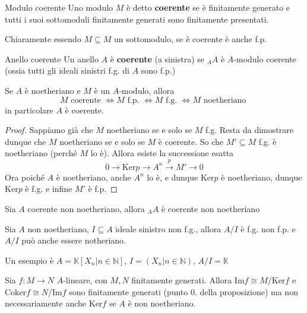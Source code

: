\begin{definition}{Modulo coerente}
    Uno modulo \(M\) è detto \textbf{coerente} se è finitamente generato e tutti
    i suoi sottomoduli finitamente generati sono finitamente presentati.
\end{definition}
\begin{remark}{}
    Chiaramente essendo \(M \subseteq M \) un sottomodulo, se è coerente è anche
    f.p.
\end{remark}
\begin{definition}{Anello coerente}
    Un anello \(A\) è \textbf{coerente} (a sinistra) se \(_AA\) è \(A\)-modulo
    coerente (ossia tutti gli ideali sinistri f.g. di \(A\) sono f.p.)
\end{definition}
\begin{remark}{}
    Se \(A\) è noetheriano e \(M\) è un \(A\)-modulo, allora
    \[
      M \text{ coerente } \iff M \text{ f.p. } \iff M \text{ f.g. } \iff M
      \text{ noetheriano }
    \]
    in particolare \(A\) è coerente. 
\end{remark}
\begin{proof}{}
    Sappiamo già che \(M\) noetheriano se e solo se \(M\) f.g. Resta da
    dimostrare dunque che \(M\) noetheriano se e solo se \(M\) è coerente. So
    che \(M' \subseteq M \) f.g. è noetheriano (perché \(M\) lo è). Allora esiste la successione esatta 
    \[
      0 \to \mathrm{Ker} p \to A^{n} \overset{p}{\to } M' \to 0
    \]
    Ora poiché \(A\) è noetheriano, anche \(A^{n}\) lo è, e dunque \(\mathrm{Ker} p \) è noetheriano, dunque \(\mathrm{Ker}p\) è f.g. e infine \(M'\) è f.p.
\end{proof}
\begin{remark}{}
    Sia \(A\) coerente non noetheriano, allora \(_AA\) è coerente non
    noetheriano
\end{remark}
\begin{example}{}
    Sia \(A\) non noetheriano, \(I \subseteq A \) ideale sinistro non f.g.,
    allora \(A/I\) è f.g. non f.p. e \(A / I\) può anche essere notheriano.

    Un esempio è \(A = \mathbb{K}[X_n | n \in \mathbb{N}]\), \(I = {(X_n | n \in \mathbb{N})}\), \(A / I = \mathbb{K}\) 

\end{example}

\begin{remark}{}
    Sia \(f : M \to N\) \(A\)-lineare, con \(M, N\) finitamente generati. Allora
    \(\mathrm{Im} f \cong M / \mathrm{Ker} f\) e \(\mathrm{Coker} f \cong N / \mathrm{Im} f \)
    sono finitamente generati (punto 0. della proposizione) ma non
    necessariamente anche \(\mathrm{Ker} f\) se \(A\) è non noetheriano.
\end{remark}


